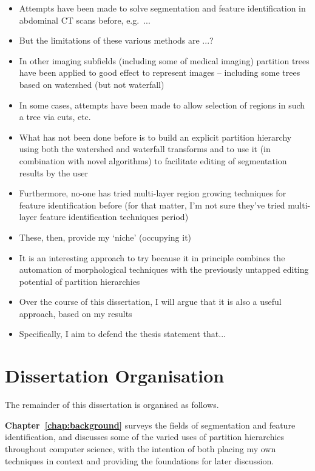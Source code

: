 \begin{itemize}

\item Attempts have been made to solve segmentation and feature identification in abdominal CT scans before, e.g.~...
\item But the limitations of these various methods are ...?
\item In other imaging subfields (including some of medical imaging) partition trees have been applied to good effect to represent images -- including some trees based on watershed (but not waterfall)
\item In some cases, attempts have been made to allow selection of regions in such a tree via cuts, etc.
\item What has not been done before is to build an explicit partition hierarchy using both the watershed and waterfall transforms and to use it (in combination with novel algorithms) to facilitate editing of segmentation results by the user
\item Furthermore, no-one has tried multi-layer region growing techniques for feature identification before (for that matter, I'm not sure they've tried multi-layer feature identification techniques period)
\item These, then, provide my `niche' (occupying it)
\item It is an interesting approach to try because it in principle combines the automation of morphological techniques with the previously untapped editing potential of partition hierarchies
\item Over the course of this dissertation, I will argue that it is also a useful approach, based on my results
\item Specifically, I aim to defend the thesis statement that...

\end{itemize}

\fi

\section{Dissertation Organisation}

The remainder of this dissertation is organised as follows.

\textbf{Chapter~\ref{chap:background}} surveys the fields of segmentation and feature identification, and discusses some of the varied uses of partition hierarchies throughout computer science, with the intention of both placing my own techniques in context and providing the foundations for later discussion.

